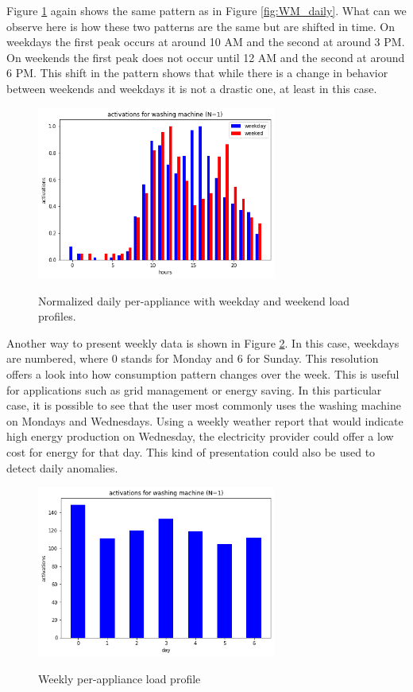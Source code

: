Figure \ref{fig:WM_ww_daily} again shows the same pattern as in Figure \ref{fig:WM_daily}.
What can we observe here is how these two patterns are the same but are shifted in time. 
On weekdays the first peak occurs at around 10 AM and the second at around 3 PM.
On weekends the first peak does not occur until 12 AM and the second at around 6 PM.
This shift in the pattern shows that while there is a change in behavior between weekends and weekdays it is not a
drastic one, at least in this case. 

\begin{figure}[H]
	\centering
	\caption{Normalized daily per-appliance with weekday and weekend load profiles.}
	\includegraphics[width=0.7\textwidth]{../Figures/LPS/WM_ww_daily.png}
	\label{fig:WM_ww_daily}
\end{figure}

Another way to present weekly data is shown in Figure \ref{fig:WM_weekly}.
In this case, weekdays are numbered, where 0 stands for Monday and 6 for Sunday.
This resolution offers a look into how consumption pattern changes over the week. 
This is useful for applications such as grid management or energy saving.
In this particular case, it is possible to see that the user most commonly uses the washing machine on Mondays and Wednesdays.
Using a weekly weather report that would indicate high energy production on Wednesday, the electricity provider could offer a low cost for energy for that day. 
This kind of presentation could also be used to detect daily anomalies.

\begin{figure}[H]
	\centering
	\caption{Weekly per-appliance load profile}
	\includegraphics[width=0.7\textwidth]{../Figures/LPS/WM_weekly.png}
	\label{fig:WM_weekly}
\end{figure}

